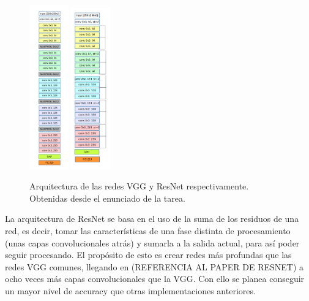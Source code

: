         \begin{figure}[t]
            \centering
            \includegraphics[width=0.15\textwidth]{img/vgg_arqr.png}
            \includegraphics[width=0.15\textwidth]{img/resnet_arq.png}
            \caption{Arquitectura de las redes VGG y ResNet respectivamente. Obtenidas desde el enunciado de la tarea.}
            \label{fig:arqs}
        \end{figure}
        
        La arquitectura de ResNet se basa en el uso de la suma de los residuos de una red, es decir, tomar las características de una fase distinta de procesamiento (unas capas convolucionales atrás) y sumarla a la salida actual, para así poder seguir procesando. El propósito de esto es crear redes más profundas que las redes VGG comunes, llegando en (REFERENCIA AL PAPER DE RESNET) a ocho veces más capas convolucionales que la VGG. Con ello se planea conseguir un mayor nivel de accuracy que otras implementaciones anteriores.
        
